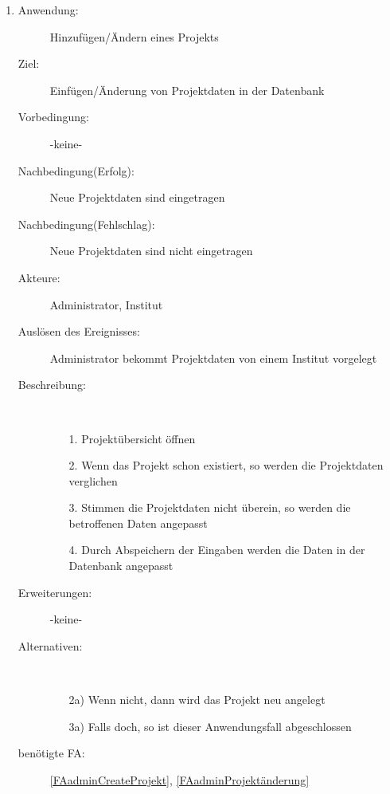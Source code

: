 \documentclass[parskip=full]{scrartcl}
\newcommand{\swtLabel}[1]{\textbf{/#1\arabic*0/}}
\begin{document}
\begin{enumerate} [label=\swtLabel{A}]
  \item \label{UCadminProjektErstellenÄndern}
    \begin{description}
  	\item[Anwendung:] Hinzufügen/Ändern eines Projekts
  	\item[Ziel:] Einfügen/Änderung von Projektdaten in der Datenbank
  	\item[Vorbedingung:] -keine-
  	\item[Nachbedingung(Erfolg):] Neue Projektdaten sind eingetragen
  	\item[Nachbedingung(Fehlschlag):] Neue Projektdaten sind nicht eingetragen
  	\item[Akteure:] Administrator, Institut
  	\item[Auslösen des Ereignisses:] Administrator bekommt Projektdaten von einem
  	Institut vorgelegt
  	\item[Beschreibung:]~
  	\begin{enumerate} 
  	  \item[1.] Projektübersicht öffnen
  	  \item[2.] Wenn das Projekt schon existiert, so werden die Projektdaten
  	  verglichen
  	  \item[3.] Stimmen die Projektdaten nicht überein, so werden die betroffenen
  	  Daten angepasst
  	  \item[4.] Durch Abspeichern der Eingaben werden die Daten in der Datenbank
  	  angepasst
  	\end{enumerate}
  	\item[Erweiterungen:] -keine-
  	\item[Alternativen:]~
  	\begin{enumerate}
  	  \item[2a)] Wenn nicht, dann wird das Projekt neu angelegt
  	  \item[3a)] Falls doch, so ist dieser Anwendungsfall abgeschlossen
  	\end{enumerate} 
  	\item[benötigte FA:] \ref{FAadminCreateProjekt}, \ref{FAadminProjektänderung}
  \end{description}
   

\end{enumerate}
\end{document}
